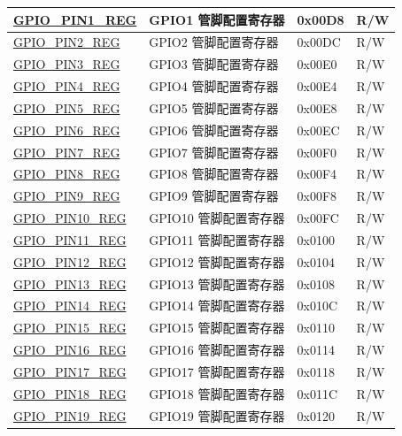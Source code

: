 \begin{longtable}{ | p{6cm} | p{7.2cm} | p{1.3cm} | p{1cm} | }
\hyperref[regdesc:GPIOPINNREG]{GPIO\_PIN1\_REG} & GPIO1 管脚配置寄存器 & 0x00D8 & R/W \\ \hline
\hyperref[regdesc:GPIOPINNREG]{GPIO\_PIN2\_REG} & GPIO2 管脚配置寄存器 & 0x00DC & R/W \\ \hline
\hyperref[regdesc:GPIOPINNREG]{GPIO\_PIN3\_REG} & GPIO3 管脚配置寄存器 & 0x00E0 & R/W \\ \hline
\hyperref[regdesc:GPIOPINNREG]{GPIO\_PIN4\_REG} & GPIO4 管脚配置寄存器 & 0x00E4 & R/W \\ \hline
\hyperref[regdesc:GPIOPINNREG]{GPIO\_PIN5\_REG} & GPIO5 管脚配置寄存器 & 0x00E8 & R/W \\ \hline
\hyperref[regdesc:GPIOPINNREG]{GPIO\_PIN6\_REG} & GPIO6 管脚配置寄存器 & 0x00EC & R/W \\ \hline
\hyperref[regdesc:GPIOPINNREG]{GPIO\_PIN7\_REG} & GPIO7 管脚配置寄存器 & 0x00F0 & R/W \\ \hline
\hyperref[regdesc:GPIOPINNREG]{GPIO\_PIN8\_REG} & GPIO8 管脚配置寄存器 & 0x00F4 & R/W \\ \hline
\hyperref[regdesc:GPIOPINNREG]{GPIO\_PIN9\_REG} & GPIO9 管脚配置寄存器 & 0x00F8 & R/W \\ \hline
\hyperref[regdesc:GPIOPINNREG]{GPIO\_PIN10\_REG} & GPIO10 管脚配置寄存器 & 0x00FC & R/W \\ \hline
\hyperref[regdesc:GPIOPINNREG]{GPIO\_PIN11\_REG} & GPIO11 管脚配置寄存器 & 0x0100 & R/W \\ \hline
\hyperref[regdesc:GPIOPINNREG]{GPIO\_PIN12\_REG} & GPIO12 管脚配置寄存器 & 0x0104 & R/W \\ \hline
\hyperref[regdesc:GPIOPINNREG]{GPIO\_PIN13\_REG} & GPIO13 管脚配置寄存器 & 0x0108 & R/W \\ \hline
\hyperref[regdesc:GPIOPINNREG]{GPIO\_PIN14\_REG} & GPIO14 管脚配置寄存器 & 0x010C & R/W \\ \hline
\hyperref[regdesc:GPIOPINNREG]{GPIO\_PIN15\_REG} & GPIO15 管脚配置寄存器 & 0x0110 & R/W \\ \hline
\hyperref[regdesc:GPIOPINNREG]{GPIO\_PIN16\_REG} & GPIO16 管脚配置寄存器 & 0x0114 & R/W \\ \hline
\hyperref[regdesc:GPIOPINNREG]{GPIO\_PIN17\_REG} & GPIO17 管脚配置寄存器 & 0x0118 & R/W \\ \hline
\hyperref[regdesc:GPIOPINNREG]{GPIO\_PIN18\_REG} & GPIO18 管脚配置寄存器 & 0x011C & R/W \\ \hline
\hyperref[regdesc:GPIOPINNREG]{GPIO\_PIN19\_REG} & GPIO19 管脚配置寄存器 & 0x0120 & R/W \\ \hline

\end{longtable}
